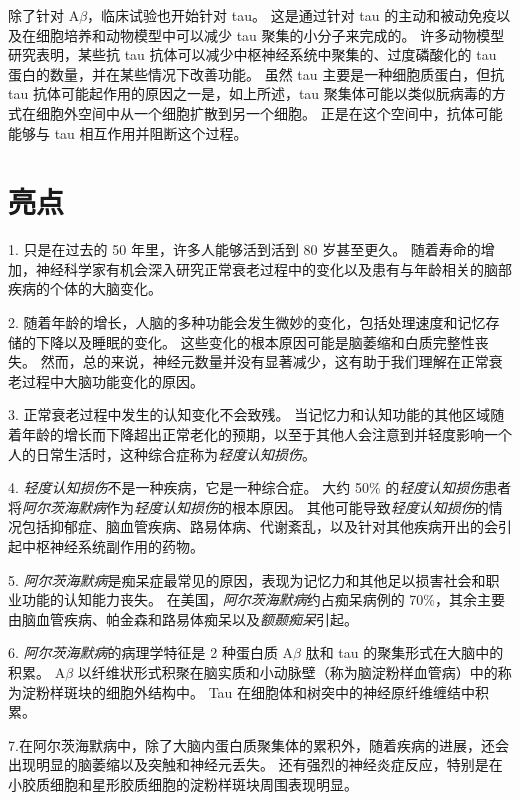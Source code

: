 除了针对 A$\beta$，临床试验也开始针对 tau。
这是通过针对 tau 的主动和被动免疫以及在细胞培养和动物模型中可以减少 tau 聚集的小分子来完成的。
许多动物模型研究表明，某些抗 tau 抗体可以减少中枢神经系统中聚集的、过度磷酸化的 tau 蛋白的数量，并在某些情况下改善功能。
虽然 tau 主要是一种细胞质蛋白，但抗 tau 抗体可能起作用的原因之一是，如上所述，tau 聚集体可能以类似朊病毒的方式在细胞外空间中从一个细胞扩散到另一个细胞。
正是在这个空间中，抗体可能能够与 tau 相互作用并阻断这个过程。



\section{亮点}

1. 只是在过去的 50 年里，许多人能够活到活到 80 岁甚至更久。
随着寿命的增加，神经科学家有机会深入研究正常衰老过程中的变化以及患有与年龄相关的脑部疾病的个体的大脑变化。


2. 随着年龄的增长，人脑的多种功能会发生微妙的变化，包括处理速度和记忆存储的下降以及睡眠的变化。
这些变化的根本原因可能是脑萎缩和白质完整性丧失。
然而，总的来说，神经元数量并没有显著减少，这有助于我们理解在正常衰老过程中大脑功能变化的原因。


3. 正常衰老过程中发生的认知变化不会致残。
当记忆力和认知功能的其他区域随着年龄的增长而下降超出正常老化的预期，以至于其他人会注意到并轻度影响一个人的日常生活时，这种综合症称为\textit{轻度认知损伤}。


4. \textit{轻度认知损伤}不是一种疾病，它是一种综合症。
大约 50\% 的\textit{轻度认知损伤}患者将\textit{阿尔茨海默病}作为\textit{轻度认知损伤}的根本原因。
其他可能导致\textit{轻度认知损伤}的情况包括抑郁症、脑血管疾病、路易体病、代谢紊乱，以及针对其他疾病开出的会引起中枢神经系统副作用的药物。


5. \textit{阿尔茨海默病}是痴呆症最常见的原因，表现为记忆力和其他足以损害社会和职业功能的认知能力丧失。
在美国，\textit{阿尔茨海默病}约占痴呆病例的 70\%，其余主要由脑血管疾病、帕金森和路易体痴呆以及\textit{额颞痴呆}引起。


6. \textit{阿尔茨海默病}的病理学特征是 2 种蛋白质 A$\beta$ 肽和 tau 的聚集形式在大脑中的积累。
A$\beta$ 以纤维状形式积聚在脑实质和小动脉壁（称为脑淀粉样血管病）中的称为淀粉样斑块的细胞外结构中。
Tau 在细胞体和树突中的神经原纤维缠结中积累。


7.在阿尔茨海默病中，除了大脑内蛋白质聚集体的累积外，随着疾病的进展，还会出现明显的脑萎缩以及突触和神经元丢失。
还有强烈的神经炎症反应，特别是在小胶质细胞和星形胶质细胞的淀粉样斑块周围表现明显。


